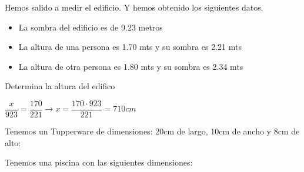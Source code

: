 \documentclass[addpoints,spanish, 12pt,a4paper]{exam}
\begin{document}
\begin{questions}



\question[1] Hemos salido a medir el edificio. Y hemos obtenido los siguientes datos.\begin{itemize}
\item La sombra del edificio es de 9.23 metros
\item La altura de una persona es 1.70 mts y su sombra es 2.21 mts
\item La altura de otra persona es 1.80 mts y su sombra es 2.34 mts
\end{itemize}
Determina la altura del edifico
\begin{solution} $\dfrac{x}{923}=\dfrac{170}{221} \to x=\dfrac{170\cdot923}{221}= 710 cm$  \end{solution}

\question Tenemos un Tupperware de dimensiones: 20cm de largo, 10cm de ancho y 8cm de alto:


\question Tenemos una piscina con las siguientes dimensiones:
\begin{center}
\end{center}
\begin{parts}

\end{parts}
\end{questions}
\end{document}
